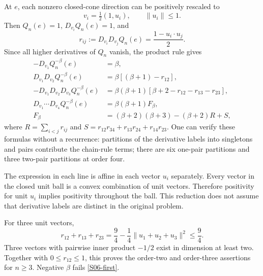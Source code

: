 \documentclass[11pt,a4paper]{article}
\theoremstyle{definition}\newtheorem{definition}[theorem]{Definition}
\theoremstyle{remark}\newtheorem{remark}[theorem]{Remark}
\numberwithin{equation}{section}
\begin{document}
At $e$, each nonzero closed-cone direction can be positively rescaled to
\[
 v_i=\tfrac12(1,u_i),\qquad \|u_i\|\le1.
\]
Then $Q_n(e)=1$, $D_{v_i}Q_n(e)=1$, and
\begin{equation}\label{S06-r}
 r_{ij}:=D_{v_i}D_{v_j}Q_n(e)=\frac{1-u_i\cdot u_j}{2}.
\end{equation}
Since all higher derivatives of $Q_n$ vanish, the product rule gives
\begin{align}
 -D_{v_1}Q_n^{-\beta}(e)&=\beta,\label{S06-first}\\
 D_{v_1}D_{v_2}Q_n^{-\beta}(e)&=\beta[(\beta+1)-r_{12}],\label{S06-second}\\
 -D_{v_1}D_{v_2}D_{v_3}Q_n^{-\beta}(e)
 &=\beta(\beta+1)[\beta+2-r_{12}-r_{13}-r_{23}],\label{S06-third}\\
 D_{v_1}\cdots D_{v_4}Q_n^{-\beta}(e)
 &=\beta(\beta+1)F_\beta,\label{S06-fourth}\\
 F_\beta&=(\beta+2)(\beta+3)-(\beta+2)R+S,\nonumber
\end{align}
where $R=\sum_{i<j}r_{ij}$ and $S=r_{12}r_{34}+r_{13}r_{24}+r_{14}r_{23}$.
One can verify these formulas without a recurrence: partitions of the derivative labels into singletons and pairs contribute the chain-rule terms; there are six one-pair partitions and three two-pair partitions at order four.

The expression in each line is affine in each vector $u_i$ separately. Every vector in the closed unit ball is a convex combination of unit vectors. Therefore positivity for unit $u_i$ implies positivity throughout the ball. This reduction does not assume that derivative labels are distinct in the original problem.

For three unit vectors,
\[
 r_{12}+r_{13}+r_{23}
 =\frac94-\frac14\|u_1+u_2+u_3\|^2\le\frac94.
\]
Three vectors with pairwise inner product $-1/2$ exist in dimension at least two. Together with $0\le r_{12}\le1$, this proves the order-two and order-three assertions for $n\ge3$. Negative $\beta$ fails \eqref{S06-first}.
\end{document}
